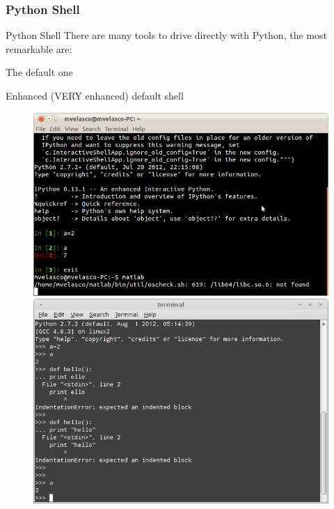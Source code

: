 \documentclass[colorlinks]{beamer}
\begin{document}
\begin{frame}[fragile]\frametitle{Python Shell}
        \begin{block}{\centering Python Shell}
\small There are many tools to drive directly with Python, the most remarkable are: 
    \begin{description}
\scriptsize    
        \item[CLIPython] The default one
        \item[IPython] Enhanced (VERY enhanced) default shell
    \end{description}
\end{block}
\begin{figure}
\begin{minipage}[b]{0.45\linewidth}
\centering
\includegraphics[width=\textwidth]{figs/commandline.jpg}
\end{minipage}
\hspace{0.5cm}
\begin{minipage}[b]{0.45\linewidth}
\centering
\includegraphics[width=\textwidth]{figs/commandline2.jpg}
\end{minipage}
\end{figure}    
\end{frame}
\end{document}
